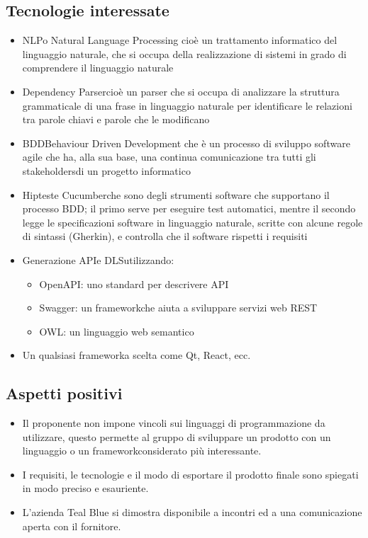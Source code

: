 \subsection{Tecnologie interessate}
\begin{itemize}
	\item NLP\glosp o Natural Language Processing cioè un trattamento informatico del linguaggio naturale, che si occupa della realizzazione di sistemi in grado di comprendere il linguaggio naturale	
	\item Dependency Parser\glosp cioè un parser che si occupa di analizzare la struttura grammaticale di una frase in linguaggio naturale per identificare le relazioni tra parole chiavi e parole che le modificano
	\item BDD\glosp Behaviour Driven Development che è un processo di sviluppo software agile che ha, alla sua base, una continua comunicazione tra tutti gli stakeholders\glosp di un progetto informatico
	\item Hiptest\glosp e Cucumber\glosp che sono degli strumenti software che supportano il processo BDD\glo; il primo serve per eseguire test automatici, mentre il secondo legge le specificazioni software in linguaggio naturale, scritte con alcune regole di sintassi (Gherkin\glo), e controlla che il software rispetti i requisiti
	\item Generazione API\glosp e DLS\glosp utilizzando:
	\begin{itemize}
		\item OpenAPI\glo: uno standard per descrivere API\glosp
		\item Swagger\glo: un framework\glosp che aiuta a sviluppare servizi web REST\glosp
		\item OWL\glo: un linguaggio web semantico
	\end{itemize}
	\item Un qualsiasi framework\glosp a scelta come Qt\glo, React\glo, ecc.
\end{itemize} 
\subsection{Aspetti positivi}
\begin{itemize} 
	\item Il proponente non impone vincoli sui linguaggi di programmazione da utilizzare, questo permette  al gruppo di sviluppare un prodotto con un linguaggio o un framework\glosp considerato più interessante. 
	\item I requisiti, le tecnologie e il modo di esportare il prodotto finale sono spiegati in modo preciso e esauriente.
	\item L'azienda Teal Blue si dimostra disponibile a incontri ed a una comunicazione aperta con il fornitore.
\end{itemize}
